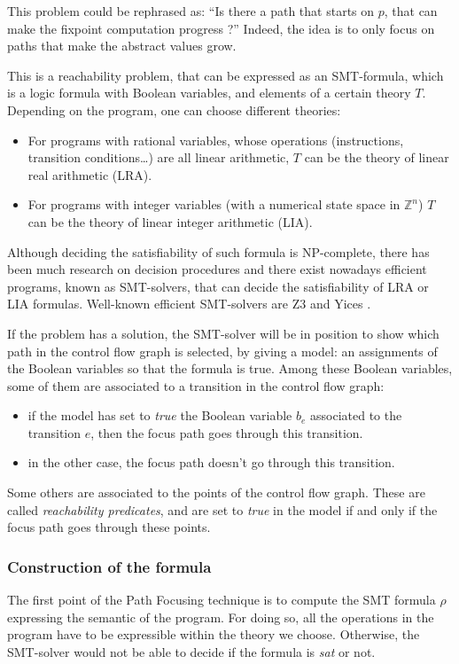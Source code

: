 \documentclass[a4paper,english,titlepage,11pt]{report}
\def\Z{\mathbb{Z}}
\begin{document}
	This problem could be rephrased as:
	``Is there a path that starts on $p$, that can make the fixpoint computation
	progress ?''
	Indeed, the idea is to only focus on paths that make the abstract values
	grow.

	This is a reachability problem, that can be expressed as an SMT-formula,
	which is a logic formula with Boolean variables, and elements of a certain
	theory $T$. Depending on the program, one can choose different theories:
	\begin{itemize}
	\item For programs with rational variables, whose operations (instructions,
	transition conditions\dots) are all linear arithmetic, $T$ can be the theory
	of linear real arithmetic (LRA).
	\item For programs with integer variables (with a numerical state space in
	$\Z^n$) $T$ can be the theory of linear integer arithmetic (LIA).
	\end{itemize}

	Although deciding the satisfiability of such formula is NP-complete, there
	has been much research on decision procedures \cite{Kroening08} and there exist nowadays
	efficient programs, known as SMT-solvers, that can decide the satisfiability
	of LRA or LIA formulas. Well-known efficient SMT-solvers are
	Z3 \cite{MouraB08} and Yices \cite{DutertreM06}. 

	If the problem has a solution,  the SMT-solver will be in position to show
	which path in the control flow graph is selected, by giving a model: an
	assignments of the Boolean variables so that the formula is true.
	Among these Boolean variables, some of them are associated to a transition
	in the control flow graph:
	\begin{itemize}
	\item if the model has set to \emph{true} the Boolean variable $b_e$ associated
	to the transition $e$, then the focus path goes through this transition.
	\item in the other case, the focus path doesn't go through this transition.
	\end{itemize}
	
	Some others are associated to the points of the control flow graph. These
	are called \emph{reachability predicates}, and are set to \emph{true} in the
	model if and only if the focus path goes through these points.

	\subsubsection{Construction of the formula}
	The first point of the Path Focusing technique is to compute the SMT formula
	$\rho$ expressing the semantic of the program. For doing so, all the
	operations in the program have to be expressible within the theory we
	choose. Otherwise, the SMT-solver would not be able to decide if the formula
	is \emph{sat} or not.
\end{document}
